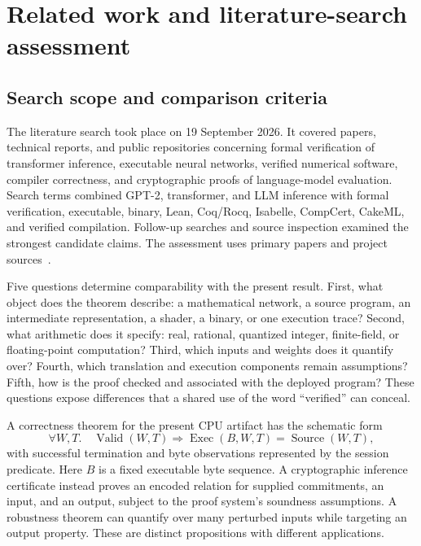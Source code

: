 \section{Related work and literature-search assessment}
\label{sec:related}

\subsection{Search scope and comparison criteria}

The literature search took place on 19 September 2026.  It covered papers, technical reports, and public repositories concerning formal verification of transformer inference, executable neural networks, verified numerical software, compiler correctness, and cryptographic proofs of language-model evaluation.  Search terms combined GPT-2, transformer, and LLM inference with formal verification, executable, binary, Lean, Coq/Rocq, Isabelle, CompCert, CakeML, and verified compilation.  Follow-up searches and source inspection examined the strongest candidate claims.  The assessment uses primary papers and project sources~\cite{lit-torchlean,lit-hls,lit-gross,lit-rush,lit-somani,lit-zkllm,lit-zkgpt,lit-deepprove,lit-laproof}.

Five questions determine comparability with the present result.  First, what object does the theorem describe: a mathematical network, a source program, an intermediate representation, a shader, a binary, or one execution trace?  Second, what arithmetic does it specify: real, rational, quantized integer, finite-field, or floating-point computation?  Third, which inputs and weights does it quantify over?  Fourth, which translation and execution components remain assumptions?  Fifth, how is the proof checked and associated with the deployed program?  These questions expose differences that a shared use of the word ``verified'' can conceal.

A correctness theorem for the present CPU artifact has the schematic form
\[
\forall W,T.\quad \operatorname{Valid}(W,T)
\Longrightarrow
\operatorname{Exec}(B,W,T)=\operatorname{Source}(W,T),
\]
with successful termination and byte observations represented by the session predicate.  Here $B$ is a fixed executable byte sequence.  A cryptographic inference certificate instead proves an encoded relation for supplied commitments, an input, and an output, subject to the proof system's soundness assumptions.  A robustness theorem can quantify over many perturbed inputs while targeting an output property.  These are distinct propositions with different applications.


